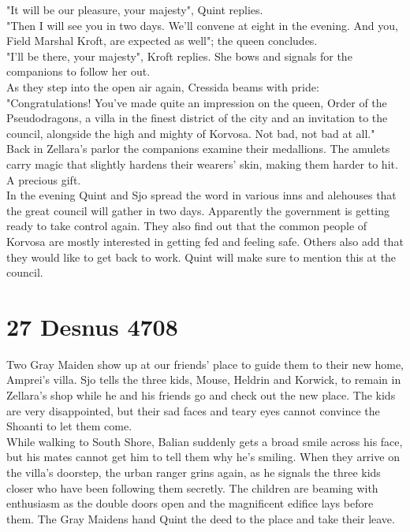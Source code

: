 "It will be our pleasure, your majesty", Quint replies.\\

"Then I will see you in two days. We'll convene at eight in the evening. And you, Field Marshal Kroft, are expected as well"; the queen concludes.\\

"I'll be there, your majesty", Kroft replies. She bows and signals for the companions to follow her out.\\

As they step into the open air again, Cressida beams with pride: "Congratulations! You've made quite an impression on the queen, Order of the Pseudodragons, a villa in the finest district of the city and an invitation to the council, alongside the high and mighty of Korvosa. Not bad, not bad at all."\\

Back in Zellara's parlor the companions examine their medallions. The amulets carry magic that slightly hardens their wearers' skin, making them harder to hit. A precious gift.\\

In the evening Quint and Sjo spread the word in various inns and alehouses that the great council will gather in two days. Apparently the government is getting ready to take control again. They also find out that the common people of Korvosa are mostly interested in getting fed and feeling safe. Others also add that they would like to get back to work. Quint will make sure to mention this at the council.\\

\section{27 Desnus 4708}

Two Gray Maiden show up at our friends' place to guide them to their new home, Amprei's villa. Sjo tells the three kids, Mouse, Heldrin and Korwick, to remain in Zellara's shop while he and his friends go and check out the new place. The kids are very disappointed, but their sad faces and teary eyes cannot convince the Shoanti to let them come.\\

While walking to South Shore, Balian suddenly gets a broad smile across his face, but his mates cannot get him to tell them why he's smiling. When they arrive on the villa's doorstep, the urban ranger grins again, as he signals the three kids closer who have been following them secretly. The children are beaming with enthusiasm as the double doors open and the magnificent edifice lays before them. The Gray Maidens hand Quint the deed to the place and take their leave.\\

